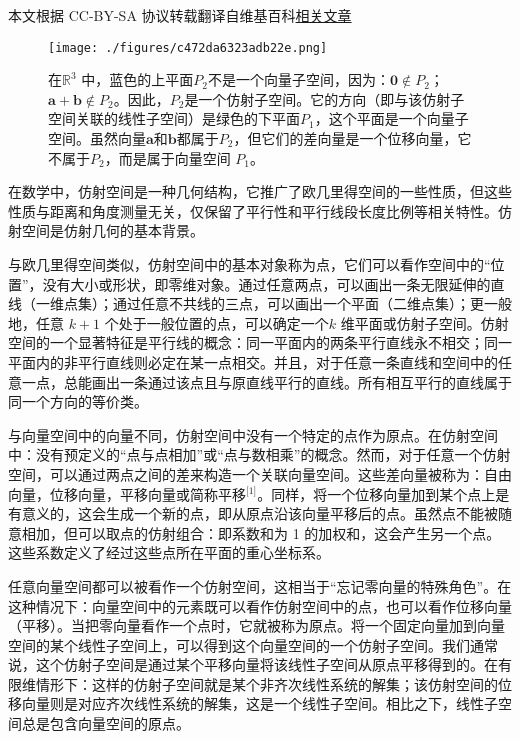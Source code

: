 
本文根据 CC-BY-SA 协议转载翻译自维基百科\href{https://en.wikipedia.org/wiki/Affine_space}{相关文章}

\begin{figure}[ht]
\centering
\texttt{[image: ./figures/c472da6323adb22e.png]}
\caption{在$\mathbb{R}^3$ 中，蓝色的上平面$P_2$不是一个向量子空间，因为：$\mathbf{0} \notin P_2$；$\mathbf{a} + \mathbf{b} \notin P_2$。因此，$P_2$是一个仿射子空间。它的方向（即与该仿射子空间关联的线性子空间）是绿色的下平面$P_1$，这个平面是一个向量子空间。虽然向量$\mathbf{a}$和$\mathbf{b}$都属于$P_2$，但它们的差向量是一个位移向量，它不属于$P_2$，而是属于向量空间 $P_1$。} \label{fig_FSKJ_1}
\end{figure}
在数学中，仿射空间是一种几何结构，它推广了欧几里得空间的一些性质，但这些性质与距离和角度测量无关，仅保留了平行性和平行线段长度比例等相关特性。仿射空间是仿射几何的基本背景。

与欧几里得空间类似，仿射空间中的基本对象称为点，它们可以看作空间中的“位置”，没有大小或形状，即零维对象。通过任意两点，可以画出一条无限延伸的直线（一维点集）；通过任意不共线的三点，可以画出一个平面（二维点集）；更一般地，任意 $k+1$ 个处于一般位置的点，可以确定一个$k$ 维平面或仿射子空间。仿射空间的一个显著特征是平行线的概念：同一平面内的两条平行直线永不相交；同一平面内的非平行直线则必定在某一点相交。并且，对于任意一条直线和空间中的任意一点，总能画出一条通过该点且与原直线平行的直线。所有相互平行的直线属于同一个方向的等价类。

与向量空间中的向量不同，仿射空间中没有一个特定的点作为原点。在仿射空间中：没有预定义的“点与点相加”或“点与数相乘”的概念。然而，对于任意一个仿射空间，可以通过两点之间的差来构造一个关联向量空间。这些差向量被称为：自由向量，位移向量，平移向量或简称平移\(^\text{[1]}\)。同样，将一个位移向量加到某个点上是有意义的，这会生成一个新的点，即从原点沿该向量平移后的点。虽然点不能被随意相加，但可以取点的仿射组合：即系数和为 1 的加权和，这会产生另一个点。这些系数定义了经过这些点所在平面的重心坐标系。

任意向量空间都可以被看作一个仿射空间，这相当于“忘记零向量的特殊角色”。在这种情况下：向量空间中的元素既可以看作仿射空间中的点，也可以看作位移向量（平移）。当把零向量看作一个点时，它就被称为原点。将一个固定向量加到向量空间的某个线性子空间上，可以得到这个向量空间的一个仿射子空间。我们通常说，这个仿射子空间是通过某个平移向量将该线性子空间从原点平移得到的。在有限维情形下：这样的仿射子空间就是某个非齐次线性系统的解集；该仿射空间的位移向量则是对应齐次线性系统的解集，这是一个线性子空间。相比之下，线性子空间总是包含向量空间的原点。

